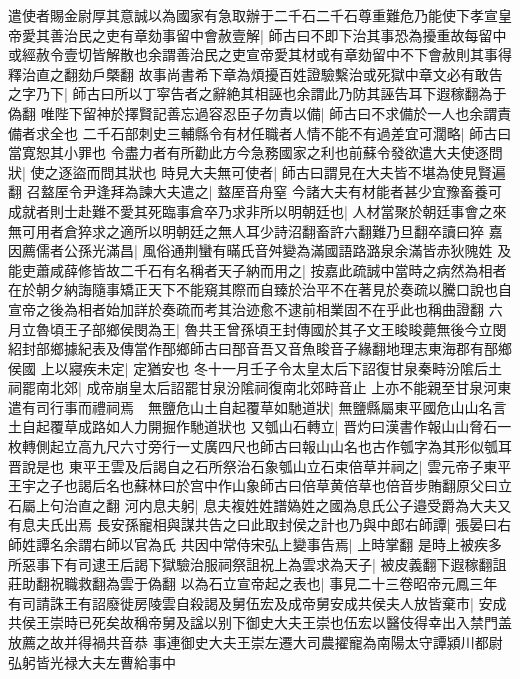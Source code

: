遣使者賜金尉厚其意誠以為國家有急取辦于二千石二千石尊重難危乃能使下孝宣皇帝愛其善治民之吏有章劾事留中會赦壹解|{
	師古曰不即下治其事恐為擾重故每留中或經赦令壹切皆解散也余謂善治民之吏宣帝愛其材或有章劾留中不下會赦則其事得釋治直之翻劾戶槩翻}
故事尚書希下章為煩擾百姓證驗繫治或死獄中章文必有敢告之字乃下|{
	師古曰所以丁寜告者之辭絶其相誣也余謂此乃防其誣告耳下遐稼翻為于偽翻}
唯陛下留神於擇賢記善忘過容忍臣子勿責以備|{
	師古曰不求備於一人也余謂責備者求全也}
二千石部刺史三輔縣令有材任職者人情不能不有過差宜可濶略|{
	師古曰當寛恕其小罪也}
令盡力者有所勸此方今急務國家之利也前蘇令發欲遣大夫使逐問狀|{
	使之逐盜而問其狀也}
時見大夫無可使者|{
	師古曰謂見在大夫皆不堪為使見賢遍翻}
召盩厔令尹逢拜為諫大夫遣之|{
	盩厔音舟窒}
今諸大夫有材能者甚少宜豫畜養可成就者則士赴難不愛其死臨事倉卒乃求非所以明朝廷也|{
	人材當聚於朝廷事會之來無可用者倉猝求之適所以明朝廷之無人耳少詩沼翻畜許六翻難乃旦翻卒讀曰猝}
嘉因薦儒者公孫光滿昌|{
	風俗通荆蠻有暪氏音舛變為滿國語路潞泉余滿皆赤狄隗姓}
及能吏蕭咸薛修皆故二千石有名稱者天子納而用之|{
	按嘉此疏誠中當時之病然為相者在於朝夕納誨隨事矯正天下不能窺其際而自臻於治平不在著見於奏疏以騰口說也自宣帝之後為相者始加詳於奏疏而考其治迹愈不逮前相業固不在乎此也稱曲證翻}
六月立魯頃王子部鄉侯閔為王|{
	魯共王曾孫頃王封傳國於其子文王睃睃薨無後今立閔紹封部鄉據紀表及傳當作郚鄉師古曰郚音吾又音魚睃音子緣翻地理志東海郡有郚鄉侯國}
上以寢疾未定|{
	定猶安也}
冬十一月壬子令太皇太后下詔復甘泉秦畤汾隂后土祠罷南北郊|{
	成帝崩皇太后詔罷甘泉汾隂祠復南北郊畤音止}
上亦不能親至甘泉河東遣有司行事而禮祠焉　無鹽危山土自起覆草如馳道狀|{
	無鹽縣屬東平國危山山名言土自起覆草成路如人力開掘作馳道狀也}
又瓠山石轉立|{
	晋灼曰漢書作報山山脅石一枚轉側起立高九尺六寸旁行一丈廣四尺也師古曰報山山名也古作瓠字為其形似瓠耳晋說是也}
東平王雲及后謁自之石所祭治石象瓠山立石束倍草并祠之|{
	雲元帝子東平王宇之子也謁后名也蘇林曰於宫中作山象師古曰倍草黄倍草也倍音步賄翻原父曰立石屬上句治直之翻}
河内息夫躬|{
	息夫複姓姓譜媯姓之國為息氏公子邉受爵為大夫又有息夫氏出焉}
長安孫寵相與謀共告之曰此取封侯之計也乃與中郎右師譚|{
	張晏曰右師姓譚名余謂右師以官為氏}
共因中常侍宋弘上變事告焉|{
	上時掌翻}
是時上被疾多所惡事下有司逮王后謁下獄驗治服祠祭詛祝上為雲求為天子|{
	被皮義翻下遐稼翻詛莊助翻祝職救翻為雲于偽翻}
以為石立宣帝起之表也|{
	事見二十三卷昭帝元鳳三年}
有司請誅王有詔廢徙房陵雲自殺謁及舅伍宏及成帝舅安成共侯夫人放皆棄市|{
	安成共侯王崇時已死矣故稱帝舅及諡以别下御史大夫王崇也伍宏以醫伎得幸出入禁門盖放薦之故并得禍共音恭}
事連御史大夫王崇左遷大司農擢寵為南陽太守譚潁川都尉弘躬皆光禄大夫左曹給事中

